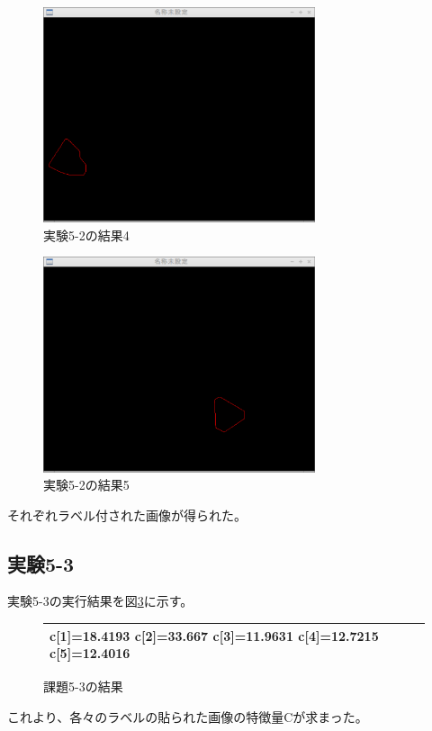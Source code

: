 \documentclass{jarticle}[2012/05/15]
\begin{document}
\begin{figure}[htbp]
  \centering
  \includegraphics[width=8cm]{kadai05-2-4.eps}
  \caption{実験5-2の結果4} \label{kadai05-2-4}
\end{figure}
\begin{figure}[htbp]
  \centering
  \includegraphics[width=8cm]{kadai05-2-5.eps}
  \caption{実験5-2の結果5} \label{kadai05-2-5}
\end{figure}
それぞれラベル付された画像が得られた。
\pagebreak
\subsection{実験5-3}
実験5-3の実行結果を図\ref{kadai05-3}に示す。\par
\begin{figure}[h]
  \begin{center}
    \begin{tabular}{|p{8cm}|}\hline
c[1]=18.4193
c[2]=33.667
c[3]=11.9631
c[4]=12.7215
c[5]=12.4016 \\ \hline
    \end{tabular}
    \caption{課題5-3の結果} \label{kadai05-3}
  \end{center}
\end{figure}
これより、各々のラベルの貼られた画像の特徴量Cが求まった。
\pagebreak
\end{document}
